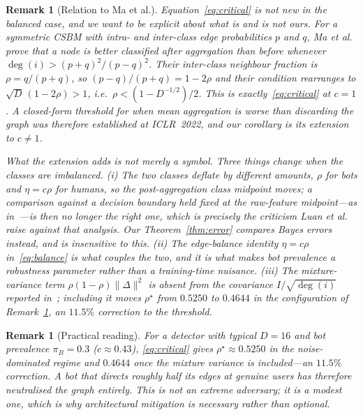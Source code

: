 \documentclass[onecolumn,pdflatex,sn-basic,Numbered]{sn-jnl}
\theoremstyle{thmstyleone}
\theoremstyle{thmstylethree}
\newtheorem{remark}[theorem]{Remark}
\begin{document}
\begin{remark}[Relation to Ma et al.]
\label{rem:ma}
Equation~\eqref{eq:critical} is not new in the balanced case, and we want to be
explicit about what is and is not ours. For a symmetric CSBM with intra- and
inter-class edge probabilities $p$ and $q$, Ma et al.~\citep[Thm.~2]{ma2022homophily}
prove that a node is better classified after aggregation than before whenever
$\deg(i) > (p+q)^2/(p-q)^2$. Their inter-class neighbour fraction is
$\rho = q/(p+q)$, so $(p-q)/(p+q) = 1-2\rho$ and their condition rearranges to
$\sqrt{D}\,(1-2\rho) > 1$, i.e.\ $\rho < (1 - D^{-1/2})/2$. This is
exactly~\eqref{eq:critical} at $c = 1$. A closed-form threshold for when mean
aggregation is worse than discarding the graph was therefore established at
ICLR~2022, and our corollary is its extension to $c \neq 1$.

What the extension adds is not merely a symbol. Three things change when the classes
are imbalanced. (i) The two classes deflate by \emph{different} amounts, $\rho$ for
bots and $\eta = c\rho$ for humans, so the post-aggregation class midpoint
\emph{moves}; a comparison against a decision boundary held fixed at the raw-feature
midpoint---as in~\citep{ma2022homophily}---is then no longer the right one, which is
precisely the criticism Luan et al.~\citep{luan2023when} raise against that
analysis. Our Theorem~\ref{thm:error} compares Bayes errors instead, and is
insensitive to this. (ii) The edge-balance identity $\eta = c\rho$
in~\eqref{eq:balance} is what couples the two, and it is what makes bot
prevalence a robustness parameter rather than a training-time nuisance. (iii) The
mixture-variance term $\rho(1-\rho)\|\Delta\|^2$ is absent from the covariance
$I/\sqrt{\deg(i)}$ reported in~\citep{ma2022homophily}; including it moves
$\rho^\star$ from $0.5250$ to $0.4644$ in the configuration of
Remark~\ref{rem:practical}, an $11.5\%$ correction to the threshold.
\end{remark}

\begin{remark}[Practical reading]
\label{rem:practical}
For a detector with typical $D = 16$ and bot prevalence $\pi_B = 0.3$
($c \approx 0.43$), \eqref{eq:critical} gives $\rho^\star \approx 0.5250$ in the
noise-dominated regime and $0.4644$ once the mixture variance is included---an
$11.5\%$ correction. A bot that
directs roughly half its edges at genuine users has therefore neutralised the graph
entirely. This is not an extreme adversary; it is a modest one, which is why
architectural mitigation is necessary rather than optional.
\end{remark}
\end{document}

